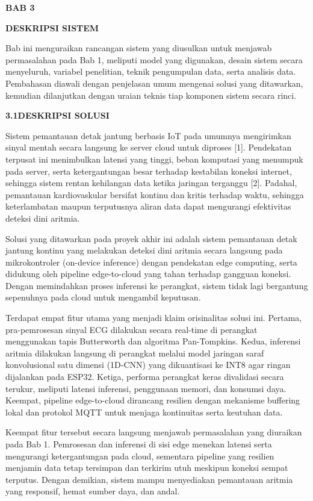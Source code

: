 \documentclass[11pt]{article}
\newcommand{\bab}[1]{\begin{center}\textbf{#1}\end{center}}
\newcommand{\Sect}[2]{\par\vspace{8pt}\noindent\textbf{#1\quad #2}\par\vspace{3pt}}
\begin{document}
\bab{BAB 3}
\bab{DESKRIPSI SISTEM}
\vspace{6pt}

Bab ini menguraikan rancangan sistem yang diusulkan untuk menjawab permasalahan pada Bab 1, meliputi model yang digunakan, desain sistem secara menyeluruh, variabel penelitian, teknik pengumpulan data, serta analisis data. Pembahasan diawali dengan penjelasan umum mengenai solusi yang ditawarkan, kemudian dilanjutkan dengan uraian teknis tiap komponen sistem secara rinci.

\Sect{3.1}{DESKRIPSI SOLUSI}

Sistem pemantauan detak jantung berbasis IoT pada umumnya mengirimkan sinyal mentah secara langsung ke server cloud untuk diproses [1]. Pendekatan terpusat ini menimbulkan latensi yang tinggi, beban komputasi yang menumpuk pada server, serta ketergantungan besar terhadap kestabilan koneksi internet, sehingga sistem rentan kehilangan data ketika jaringan terganggu [2]. Padahal, pemantauan kardiovaskular bersifat kontinu dan kritis terhadap waktu, sehingga keterlambatan maupun terputusnya aliran data dapat mengurangi efektivitas deteksi dini aritmia.

Solusi yang ditawarkan pada proyek akhir ini adalah sistem pemantauan detak jantung kontinu yang melakukan deteksi dini aritmia secara langsung pada mikrokontroler (on-device inference) dengan pendekatan edge computing, serta didukung oleh pipeline edge-to-cloud yang tahan terhadap gangguan koneksi. Dengan memindahkan proses inferensi ke perangkat, sistem tidak lagi bergantung sepenuhnya pada cloud untuk mengambil keputusan.

Terdapat empat fitur utama yang menjadi klaim orisinalitas solusi ini. Pertama, pra-pemrosesan sinyal ECG dilakukan secara real-time di perangkat menggunakan tapis Butterworth dan algoritma Pan-Tompkins. Kedua, inferensi aritmia dilakukan langsung di perangkat melalui model jaringan saraf konvolusional satu dimensi (1D-CNN) yang dikuantisasi ke INT8 agar ringan dijalankan pada ESP32. Ketiga, performa perangkat keras divalidasi secara terukur, meliputi latensi inferensi, penggunaan memori, dan konsumsi daya. Keempat, pipeline edge-to-cloud dirancang resilien dengan mekanisme buffering lokal dan protokol MQTT untuk menjaga kontinuitas serta keutuhan data.

Keempat fitur tersebut secara langsung menjawab permasalahan yang diuraikan pada Bab 1. Pemrosesan dan inferensi di sisi edge menekan latensi serta mengurangi ketergantungan pada cloud, sementara pipeline yang resilien menjamin data tetap tersimpan dan terkirim utuh meskipun koneksi sempat terputus. Dengan demikian, sistem mampu menyediakan pemantauan aritmia yang responsif, hemat sumber daya, dan andal.
\end{document}
